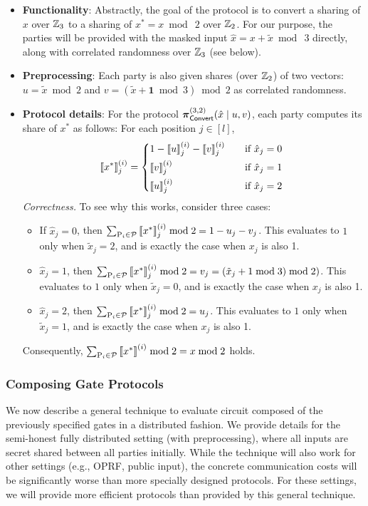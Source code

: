 \begin{itemize}
  \item \textbf{Functionality}: Abstractly, the goal of the protocol is to convert a sharing of $x$ over $\mathbb{Z}_3$ to a sharing of $x^* = x \bmod~2$ over $\mathbb{Z}_2$. For our purpose, the parties will be provided with the masked input $\hat{x} = x + \tilde{x} \bmod~3$ directly, along with correlated randomness over $\mathbb{Z}_3$ (see below).

  \item \textbf{Preprocessing}: Each party is also given shares (over $\mathbb{Z}_2$) of two vectors: $u = \tilde{x} \bmod 2$ and $v = (\tilde{x} + \textbf{1} \bmod 3) \bmod 2$ as correlated randomness.


  \item \textbf{Protocol details}: For the protocol $\boldsymbol{\pi}_{\textnormal{\textsf{Convert}}}^{(3,2)}(\hat{x} \mid u, v)$, each party computes its share of $x^*$ as follows: For each position $j \in [l]$,
\[
\sharei{x^*}_j = 
\begin{cases*}
       1 - \sharei{u}_j - \sharei{v}_j  & \quad if $\hat{x}_j = 0$ \\
       \sharei{v}_j & \quad if $\hat{x}_j = 1$ \\
       \sharei{u}_j & \quad if $\hat{x}_j = 2$
\end{cases*}
\]
\textit{Correctness.} To see why this works, consider three cases:
\begin{itemize}
\item If $\hat{x}_j = 0$, then $\sum_{\textnormal{P}_i \in \mathcal{P}} \left\llbracket x^* \right\rrbracket^{(i)}_j \bmod 2 = 1 - u_j - v_j$. This evaluates to $1$ only when $\tilde{x}_j = 2$, and is exactly the case when $x_j$ is also 1.

\item $\hat{x}_j = 1$, then $\sum_{\textnormal{P}_i \in \mathcal{P}} \left\llbracket x^* \right\rrbracket^{(i)}_j \bmod 2 = v_j = (\tilde{x}_j + 1 \bmod 3) \bmod 2)$. This evaluates to $1$ only when $\tilde{x}_j = 0$, and is exactly the case when $x_j$ is also 1.

\item $\hat{x}_j = 2$, then $\sum_{\textnormal{P}_i \in \mathcal{P}} \left\llbracket x^* \right\rrbracket^{(i)}_j \bmod 2 = u_j$. This evaluates to $1$ only when $\tilde{x}_j = 1$, and is exactly the case when $x_j$ is also 1.
\end{itemize}
Consequently, $\sum_{\textnormal{P}_i \in \mathcal{P}} \left\llbracket x^* \right\rrbracket^{(i)} \bmod 2 = x \bmod 2$ holds.
\end{itemize}



\subsubsection{Composing Gate Protocols}
We now describe a general technique to evaluate circuit composed of the previously specified gates in a distributed fashion. We provide details for the semi-honest fully distributed setting (with preprocessing), where all inputs are secret shared between all parties initially. While the technique will also work for other settings (e.g., OPRF, public input), the concrete communication costs will be significantly worse than more specially designed protocols. For these settings, we will provide more efficient protocols than provided by this general technique.

